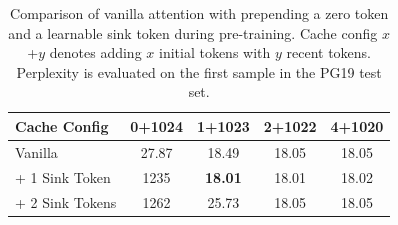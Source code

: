 \documentclass{article} \usepackage{iclr2024_conference,times}
\begin{document}
\begin{table}
    \centering
    \setlength{\tabcolsep}{3pt}
    \small
    \caption{Comparison of vanilla attention with prepending a zero token and a learnable sink token during pre-training. Cache config $x$+$y$ denotes adding $x$ initial tokens with $y$ recent tokens. Perplexity is evaluated on the first sample in the PG19 test set.}
    \label{tab:pretrain_fix2}
    \begin{tabular}{lcccc}
        \toprule
        Cache Config    & 0+1024 & 1+1023         & 2+1022 & 4+1020 \\
        \midrule
        Vanilla         & 27.87  & 18.49          & 18.05  & 18.05  \\
        + 1 Sink Token  & 1235   & \textbf{18.01} & 18.01  & 18.02  \\
        + 2 Sink Tokens & 1262   & 25.73          & 18.05  & 18.05  \\
        \bottomrule
    \end{tabular}
\end{table}
 
\end{document}
